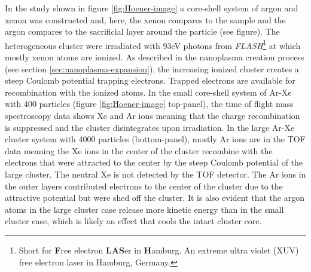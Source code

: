 In the study shown in figure \ref{fig:Hoener-image} a core-shell system of argon and xenon was constructed and, here, the xenon compares to the sample and the argon compares to the sacrificial layer around the particle (see figure). The heterogeneous cluster were irradiated with 93eV photons from \textit{FLASH}\footnote{Short for \textbf{F}ree electron \textbf{LAS}er in \textbf{H}amburg. An extreme ultra violet (XUV) free electron laser in Hamburg, Germany.} at which mostly xenon atoms are ionized. As described in the nanoplasma creation process (see section \ref{sec:nanoplasma-expansion}), the increasing ionized cluster creates a steep Coulomb potential trapping electrons. Trapped electrons are available for recombination with the ionized atoms. In the small core-shell system of Ar-Xe with 400 particles (figure \ref{fig:Hoener-image} top-panel), the time of flight mass spectroscopy data shows Xe and Ar ions meaning that the charge recombination is suppressed and the cluster disintegrates upon irradiation. In the large Ar-Xe cluster system with 4000 particles (bottom-panel), mostly Ar ions are in the TOF data meaning the Xe ions in the center of the cluster recombine with the electrons that were attracted to the center by the steep Coulomb potential of the large cluster. The neutral Xe is not detected by the TOF detector. The Ar ions in the outer layers contributed electrons to the center of the cluster due to the attractive potential but were shed off the cluster. It is also evident that the argon atoms in the large cluster case release more kinetic energy than in the small cluster case, which is likely an effect that cools the intact cluster core.
%
%
%
%